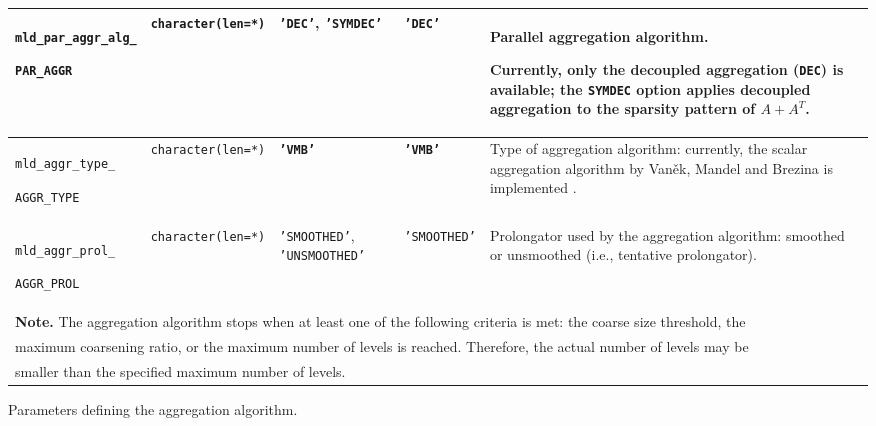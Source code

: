 \begin{center}
\begin{tabular}{|p{3.9cm}|l|p{2.3cm}|p{2.9cm}|p{6.9cm}|}
\verb|mld_par_aggr_alg_|  \par \verb|PAR_AGGR|  & \verb|character(len=*)| \hspace*{-3mm}
                         & \texttt{'DEC'}, \texttt{'SYMDEC'}
                         & \texttt{'DEC'}
                         & Parallel aggregation algorithm. \par Currently, only the
                         decoupled aggregation (\verb|DEC|) is available; the
                           \verb|SYMDEC| option  applies decoupled
                           aggregation to  the sparsity pattern
                           of $A+A^T$.\\ \hline
\verb|mld_aggr_type_|  \par \verb|AGGR_TYPE|  & \verb|character(len=*)| \hspace*{-3mm}
                         & \textbf{\texttt{'VMB'}} & \textbf{\texttt{'VMB'}}   
                         & Type of aggregation algorithm: currently, the scalar aggregation
                             algorithm by Van\v{e}k, Mandel and Brezina is implemented
                             \cite{VANEK_MANDEL_BREZINA}. \\ \hline
\verb|mld_aggr_prol_|  \par \verb|AGGR_PROL|  & \verb|character(len=*)| \hspace*{-3mm}
                         & \texttt{'SMOOTHED'}, \texttt{'UNSMOOTHED'} & \texttt{'SMOOTHED'}
                         & Prolongator used by the aggregation algorithm: smoothed or unsmoothed
                         (i.e., tentative prolongator). \\
\hline
\multicolumn{5}{|l|}{{\bfseries Note.} The aggregation algorithm stops when
at least one of the following criteria is met: 
the coarse size threshold, the} \\
\multicolumn{5}{|l|}{maximum coarsening ratio, or the maximum number
of levels is reached. Therefore, the actual number of levels may be} \\
\multicolumn{5}{|l|}{smaller than the specified maximum number
of levels. } \\
\hline
\end{tabular}
\end{center}
\caption{Parameters defining the aggregation algorithm.
\label{tab:p_aggregation}} 
\esideways

